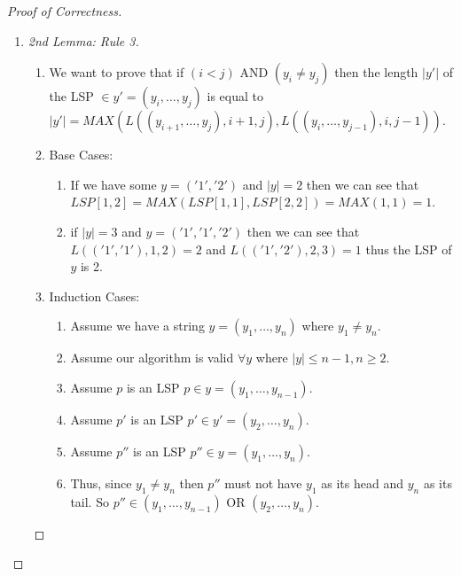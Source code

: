 \documentclass{article}
\begin{document}
\begin{proof}[Proof of Correctness]
\begin{enumerate}
            \item
                  \begin{proof}[2nd Lemma: Rule 3]
                        \begin{enumerate}
                              \item We want to prove that if \((i < j)\) AND \((y_i \neq y_j)\) then the length \(|y'|\)
                                    of the LSP \(\in y' = (y_i,\dots,y_j)\) is equal to \(|y'| =
                                    MAX(L((y_{i+1},\dots,y_j),i+1,j),L((y_i,\dots,y_{j-1}),i,j-1))\).
                              \item Base Cases:
                                    \begin{enumerate}
                                          \item If we have some \(y = ('1', '2')\) and \(|y|=2\)  then we can see that
                                                \(LSP[1,2] = MAX(LSP[1,1],LSP[2,2]) = MAX(1,1) = 1\).
                                          \item if \(|y|=3\) and \(y = ('1','1','2')\)  then we can see that \(L(('1','1'),1,2)=2\)
                                                and \(L(('1','2'),2,3)=1\)  thus the LSP of \(y\) is 2.
                                    \end{enumerate}
                              \item Induction Cases:
                                    \begin{enumerate}
                                          \item Assume we have a string \(y = (y_1,\dots,y_n)\) where \(y_1 \neq y_n\).
                                          \item Assume our algorithm is valid \(\forall y\) where \(|y| \leq n-1, n \geq 2\).
                                          \item Assume \(p\) is an LSP \(p \in y = (y_1,\dots,y_{n-1})\).
                                          \item Assume \(p'\) is an LSP \(p' \in y' = (y_2,\dots,y_n)\).
                                          \item Assume \(p''\) is an LSP \(p'' \in y = (y_1,\dots,y_n)\).
                                          \item Thus, since \(y_1 \neq y_n\)  then \(p''\) must not have \(y_1\) as its head
                                                and \(y_n\) as its tail. So \(p'' \in (y_1,\dots,y_{n-1})\) OR \((y_2,\dots,y_n)\).

\end{enumerate}
\end{enumerate}
\end{proof}
\end{enumerate}
\end{proof}
\end{document}
